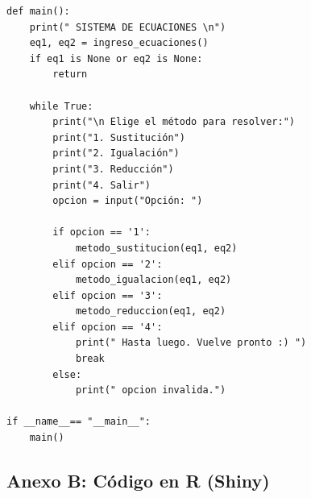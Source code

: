 \documentclass[a4paper,10pt]{article}
\begin{document}
\begin{lstlisting}
def main():
    print(" SISTEMA DE ECUACIONES \n")
    eq1, eq2 = ingreso_ecuaciones()
    if eq1 is None or eq2 is None:
        return

    while True:
        print("\n Elige el método para resolver:")
        print("1. Sustitución")
        print("2. Igualación")
        print("3. Reducción")
        print("4. Salir")
        opcion = input("Opción: ")

        if opcion == '1':
            metodo_sustitucion(eq1, eq2)
        elif opcion == '2':
            metodo_igualacion(eq1, eq2)
        elif opcion == '3':
            metodo_reduccion(eq1, eq2)
        elif opcion == '4':
            print(" Hasta luego. Vuelve pronto :) ")
            break
        else:
            print(" opcion invalida.")

if __name__== "__main__":
    main()

\end{lstlisting}

\subsection*{Anexo B: Código en R (Shiny)}

\end{document}
